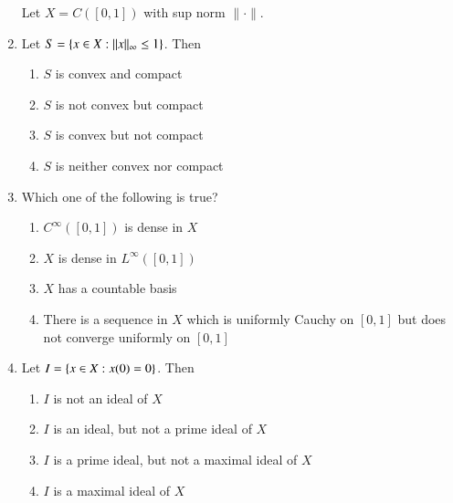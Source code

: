 \documentclass[journal,12pt,onecolumn]{IEEEtran}
\theoremstyle{remark}
\begin{document}
\begin{enumerate}
Let \( X = C([0,1]) \) with sup norm \( \|\cdot\| \).

\item Let \( S = \left\{ x \in X : \|x\|_{\infty} \le 1 \right\} \). Then
\\[-0.3em]\makebox[\textwidth][r]{\textit{[GATE EE 2025]}}

\begin{multicols}{2}
\begin{enumerate}[label=(\Alph*)]
\item \( S \) is convex and compact
\item \( S \) is not convex but compact
\item \( S \) is convex but not compact
\item \( S \) is neither convex nor compact
\end{enumerate}
\end{multicols}

\item Which one of the following is true?
\\[-0.3em]\makebox[\textwidth][r]{\textit{[GATE EE 2025]}}

\begin{multicols}{2}
\begin{enumerate}[label=(\Alph*)]
\item \( C^{\infty}([0,1]) \) is dense in \( X \)
\item \( X \) is dense in \( L^{\infty}([0,1]) \)
\item \( X \) has a countable basis
\item There is a sequence in \( X \) which is uniformly Cauchy on \([0,1]\) but does not converge uniformly on \([0,1]\)
\end{enumerate}
\end{multicols}

\item Let \( I = \left\{ x \in X : x(0) = 0 \right\} \). Then
\\[-0.3em]\makebox[\textwidth][r]{\textit{[GATE EE 2025]}}

\begin{multicols}{2}
\begin{enumerate}[label=(\Alph*)]
\item \( I \) is not an ideal of \( X \)
\item \( I \) is an ideal, but not a prime ideal of \( X \)
\item \( I \) is a prime ideal, but not a maximal ideal of \( X \)
\item \( I \) is a maximal ideal of \( X \)
\end{enumerate}
\end{multicols}



\end{enumerate}
\end{document}

